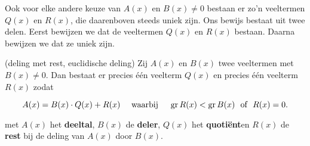 \documentclass{ximera}
\begin{document}
Ook voor elke andere keuze van $A(x)$ en $B(x) \neq 0$ bestaan er zo'n veeltermen $Q(x)$ en $R(x)$, die daarenboven steeds uniek zijn. Ons bewijs bestaat uit twee delen. Eerst bewijzen we dat de veeltermen $Q(x)$ en $R(x)$ bestaan. Daarna bewijzen we dat ze uniek zijn. 








\begin{theorem}(deling met rest, euclidische deling)
Zij $A(x)$ en $B(x)$ twee veeltermen met $B(x) \neq 0$. Dan bestaat er precies één veelterm $Q(x)$ en precies één veelterm $R(x)$ zodat

\begin{equation}
A(x) = B(x)\cdot Q(x) + R(x) \quad \text{ waarbij } \quad \operatorname{gr} R(x) < \operatorname{gr} B(x) \,\, \text{ of } \,\, R(x) = 0.
\end{equation}

met $A(x)$ het \textbf{deeltal}, $B(x)$ de \textbf{deler}, $Q(x)$ het \textbf{quotiënt}en $R(x)$ de \textbf{rest} bij de deling van $A(x)$ door $B(x)$. 
\end{theorem} 
\end{document}
